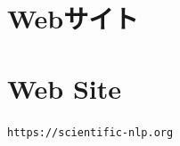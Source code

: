 \ifja
    \section*{\fullSNLP Webサイト}
\else
    \section*{\fullSNLP Web Site}
\fi
\begin{center}

  \vspace{0.5em}

  {\footnotesize\texttt{https://scientific-nlp.org}}
\end{center}
